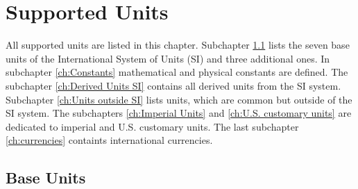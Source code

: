 \documentclass{ltxdoc}
\begin{document}
\newcommand{\C}[1][]{\mathrm{C}^{#1}\,}

\newcommand{\1}{\mathrm{1}}




\newpage
\section{Supported Units}
\label{ch:Supported Units}

All supported units are listed in this chapter. Subchapter \ref{ch:Base Units} lists the seven base units of the International System of Units (SI) and three additional ones. In subchapter \ref{ch:Constants}  mathematical and physical constants are defined. The subchapter \ref{ch:Derived Units SI} contains all derived units from the SI system. Subchapter \ref{ch:Units outside SI} lists units, which are common but outside of the SI system. The subchapters \ref{ch:Imperial Units} and \ref{ch:U.S. customary units} are dedicated to imperial and U.S. customary units. The last subchapter \ref{ch:currencies} containts international currencies.



\subsection{Base Units}
\label{ch:Base Units}
\end{document}
